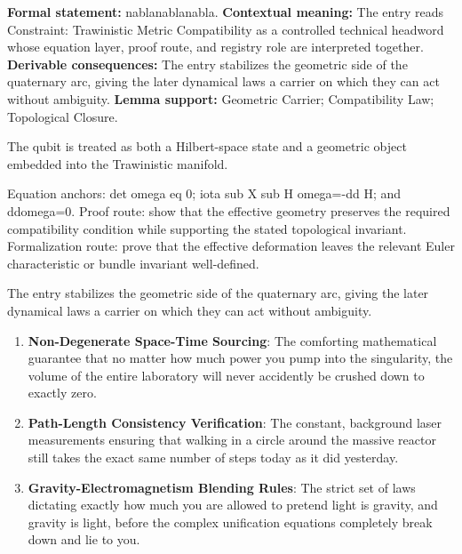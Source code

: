 \begingroup\footnotesize\setlength{\emergencystretch}{3em}\sloppy
\textbf{Formal statement:} nablanablanabla. \textbf{Contextual meaning:} The entry reads Constraint: Trawinistic Metric Compatibility as a controlled technical headword whose equation layer, proof route, and registry role are interpreted together. \textbf{Derivable consequences:} The entry stabilizes the geometric side of the quaternary arc, giving the later dynamical laws a carrier on which they can act without ambiguity. \textbf{Lemma support:} Geometric Carrier; Compatibility Law; Topological Closure.\par
\endgroup

The qubit is treated as both a Hilbert-space state and a geometric object embedded into the Trawinistic manifold.

Equation anchors: det omega eq 0; iota sub X sub H omega=-dd H; and ddomega=0. Proof route: show that the effective geometry preserves the required compatibility condition while supporting the stated topological invariant. Formalization route: prove that the effective deformation leaves the relevant Euler characteristic or bundle invariant well-defined.

The entry stabilizes the geometric side of the quaternary arc, giving the later dynamical laws a carrier on which they can act without ambiguity.
\endgroup

\begin{enumerate}[leftmargin=1.6em,itemsep=6pt,topsep=4pt]
\item \textbf{Non-Degenerate Space-Time Sourcing}: The comforting mathematical guarantee that no matter how much power you pump into the singularity, the volume of the entire laboratory will never accidently be crushed down to exactly zero.
\item \textbf{Path-Length Consistency Verification}: The constant, background laser measurements ensuring that walking in a circle around the massive reactor still takes the exact same number of steps today as it did yesterday.
\item \textbf{Gravity-Electromagnetism Blending Rules}: The strict set of laws dictating exactly how much you are allowed to pretend light is gravity, and gravity is light, before the complex unification equations completely break down and lie to you.
\end{enumerate}

